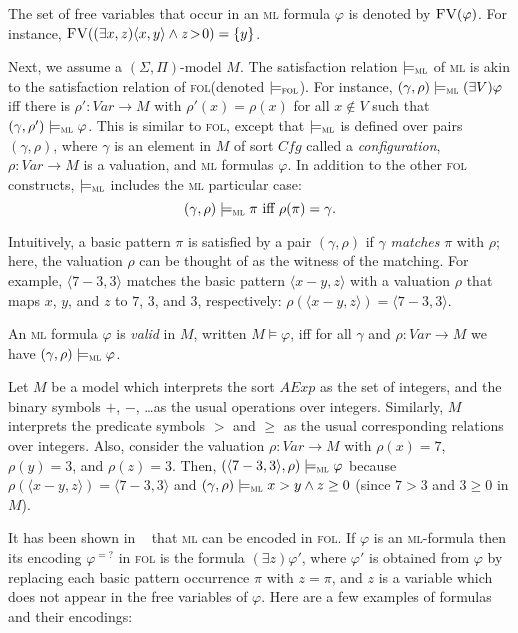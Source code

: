 \documentclass[conference]{IEEEtran}
\newenvironment{todo}{\medskip\hrule\smallskip\noindent}{\smallskip\hrule\medskip}
\newcommand{\dl}[1]{\begin{todo}\textcolor{blue}{Dorel:}\\ \color{red}{#1}\color{black}\end{todo}}
\newcommand{\dl}[1]{}
\newcommand{\Cfg}{\mathit{Cfg}}
\newcommand{\M}{\mathit{M}}
\newcommand{\Var}{\mathit{Var}}
\newcommand{\FreeVars}{\mathit{\textsc{FV}}}
\newcommand{\ML}{\textsc{ml}\xspace}
\newcommand{\FOL}{\textsc{fol}\xspace}
\newcommand{\modelsml}{\models_\ML}
\newcommand{\modelsfol}{\models_\FOL}
\begin{document}
The set of free variables that occur in an \ML formula $\varphi$ is denoted by $\FreeVars(\varphi)$. 
For instance,  $\FreeVars((\exists x,z) \langle x, y \rangle \land z \!>\! 0) = \{ y \}$.

Next, we assume a $(\Sigma, \Pi)$-model $\M$. 
The satisfaction relation $\modelsml$ of \ML is akin to the satisfaction relation of \FOL (denoted $\modelsfol$).
For instance, $(\gamma, \rho) \modelsml (\exists V)\varphi$ iff  there is $\rho' : \Var \to \M$ with $\rho'(x) = \rho(x)$ for all $x \not\in V$ such that $(\gamma, \rho') \modelsml \varphi$.
This is similar to \FOL, except that $\modelsml$ is defined over pairs $(\gamma, \rho)$, where $\gamma$ is an element in $\M$ of sort $\Cfg$ called a \emph{configuration}, $\rho : \Var \to \M$ is a valuation, and \ML formulas $\varphi$. 
In addition to the other \FOL constructs, $\modelsml$ includes the \ML particular case:
$$(\gamma, \rho) \modelsml \pi \text{ iff } \rho(\pi) = \gamma.$$

\noindent
Intuitively, a basic pattern $\pi$ is satisfied by a pair $(\gamma, \rho)$ if $\gamma$ \emph{matches} $\pi$ with $\rho$; here, the valuation $\rho$ can be thought of as the witness of the matching.
For example, $\langle 7 - 3, 3 \rangle$ matches the basic pattern $\langle x - y, z \rangle$ with a valuation $\rho$ that maps $x$, $y$, and $z$ to $7$, $3$, and $3$, respectively: $\rho(\langle x - y, z \rangle) = \langle 7 - 3, 3 \rangle$.

An \ML formula $\varphi$ is \emph{valid} in $\M$, written $\M \models \varphi$, iff for all $\gamma$ and $\rho:\Var\to\M$ we have $(\gamma, \rho)\modelsml\varphi$.


Let $\M$ be a model which interprets the sort $\mathit{A\!Exp}$ as the set of integers, and the binary symbols $+$, $-$, \ldots as the usual operations over integers.
Similarly, $\M$ interprets the predicate symbols $>$ and $\geq$ as the usual corresponding relations over integers.
Also, consider the valuation $\rho:\Var \to \M$ with $\rho(x) = 7$, $\rho(y) = 3$, and $\rho(z) = 3$.
Then, $(\langle 7 - 3, 3 \rangle, \rho) \modelsml \varphi$ because $\rho(\langle x - y, z \rangle) = \langle 7 - 3, 3 \rangle$ and $(\gamma, \rho) \modelsml x > y \land z \geq 0$ (since $7 > 3$ and $3 \geq 0$ in $\M$).

It has been shown in ~\cite{rosu-stefanescu-2012-oopsla} that \ML can be encoded in \FOL.
If $\varphi$ is an \ML-formula then its encoding $\varphi^{=?}$ in \FOL is the formula $(\exists z)\varphi'$,  where $\varphi'$ is obtained from $\varphi$ by replacing each basic pattern occurrence $\pi$ with $z=\pi$, and $z$ is a variable which does not appear in the free variables of $\varphi$.
Here are a few examples of formulas and their encodings:\\
\end{document}
